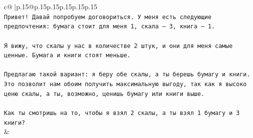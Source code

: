\documentclass{article}
\begin{document}
{\begin{supertabular}{c@{$\;$}|p{.15\linewidth}@{}p{.15\linewidth}p{.15\linewidth}p{.15\linewidth}p{.15\linewidth}p{.15\linewidth}}
{{{\\ 
\texttt{Привет! Давай попробуем договориться. У меня есть следующие предпочтения: бумага стоит для меня 1, скала — 3, книга — 1.} \\
\\ 
\texttt{Я вижу, что скалы у нас в количестве 2 штук, и они для меня самые ценные. Бумага и книги стоят меньше.} \\
\\ 
\texttt{Предлагаю такой вариант: я беру обе скалы, а ты берешь бумагу и книги. Это позволит нам обоим получить максимальную выгоду, так как я высоко ценю скалы, а ты, возможно, ценишь бумагу или книги выше.} \\
\\ 
\texttt{Как ты смотришь на то, чтобы я взял 2 скалы, а ты взял 1 бумагу и 3 книги?} \\
            }
        }
    }
    & \\ \\


\end{supertabular}}
\end{document}
